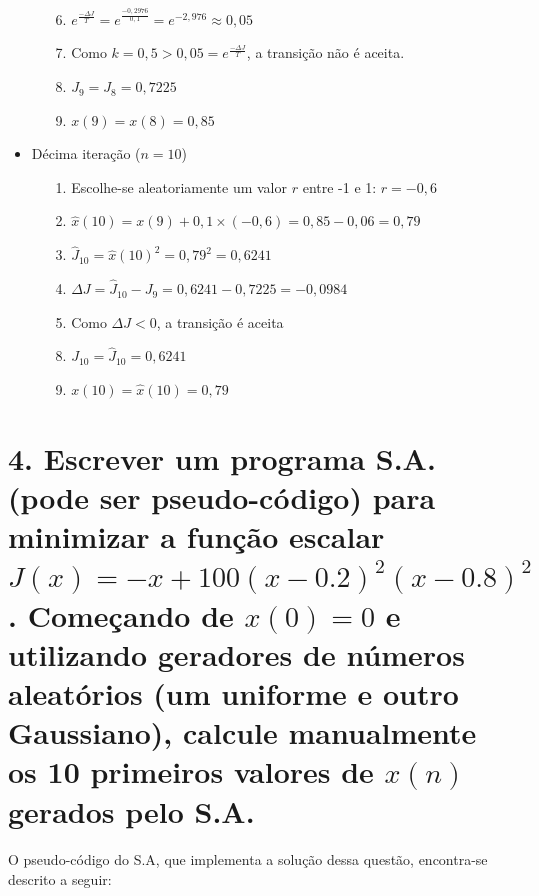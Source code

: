 \documentclass{report}
\begin{document}
\begin{itemize}
\begin{itemize}
\item[6.] $e^{\frac{- \Delta J}{T}} = e^{\frac{- 0,2976}{0,1}} = e^{-2,976} \approx 0,05$

\item[7.] Como $k = 0,5 > 0,05 = e^{\frac{- \Delta J}{T}}$, a transição não é aceita.

\item[8.] $J_{9} = J_{8} = 0,7225$

\item[9.] $x(9) = x(8) = 0,85$

\end{itemize}

\item Décima iteração ($n = 10$)

\begin{itemize}

\item[1.] Escolhe-se aleatoriamente um valor $r$ entre -1 e 1: $r = -0,6$

\item[2.] $\hat{x}(10) = x(9) + 0,1 \times (-0,6) = 0,85 - 0,06 = 0,79$

\item[3.] $\hat{J}_{10} = \hat{x}(10)^2 = 0,79^2 = 0,6241$

\item[4.] $\Delta J = \hat{J}_{10} - J_{9} = 0,6241 - 0,7225 = -0,0984$

\item[5.] Como $\Delta J < 0$, a transição é aceita

\item[8.] $J_{10} = \hat{J}_{10} = 0,6241$

\item[9.] $x(10) = \hat{x}(10) = 0,79$

\end{itemize}

\end{itemize}

\section*{4. Escrever um programa S.A. (pode ser pseudo-código) para minimizar a função escalar $J(x) = -x + 100(x - 0.2)^2(x - 0.8)^2$. Começando de $x(0) = 0$ e utilizando geradores de números aleatórios (um uniforme e outro Gaussiano), calcule manualmente os 10 primeiros valores de $x(n)$ gerados pelo S.A.}

\paragraph{} O pseudo-código do S.A, que implementa a solução dessa questão, encontra-se descrito a seguir:
\end{document}
